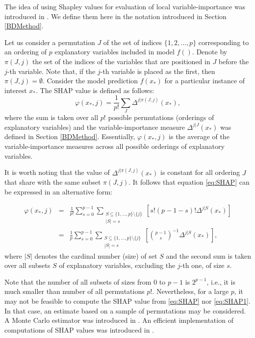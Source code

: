 \documentclass[12pt,]{krantz}
\begin{document}
The idea of using Shapley values for evaluation of local variable-importance was introduced in \citep{imeJLMR}. We define them here in the notation introduced in Section \ref{BDMethod}.

Let us consider a permutation \(J\) of the set of indices \(\{1,2,\ldots,p\}\) corresponding to an ordering of \(p\) explanatory variables included in model \(f()\). Denote by \(\pi(J,j)\) the set of the indices of the variables that are positioned in \(J\) before the \(j\)-th variable. Note that, if the \(j\)-th variable is placed as the first, then \(\pi(J,j) = \emptyset\). Consider the model prediction \(f(x_*)\) for a particular instance of interest \(x_*\). The SHAP value is defined as follows:
\begin{equation}
\varphi(x_*,j) = \frac{1}{p!} \sum_{J} \Delta^{j|\pi(J,j)}(x_*),  
\label{eq:SHAP}
\end{equation}
where the sum is taken over all \(p!\) possible permutations (orderings of explanatory variables) and the variable-importance measure \(\Delta^{j|J}(x_*)\) was defined in Section \ref{BDMethod}. Essentially, \(\varphi(x_*,j)\) is the average of the variable-importance measures across all possible orderings of explanatory variables.

It is worth noting that the value of \(\Delta^{j|\pi(J,j)}(x_*)\) is constant for all ordering \(J\) that share with the same subset \(\pi(J,j)\). It follows that equation \eqref{eq:SHAP} can be expressed in an alternative form:

\begin{eqnarray}
\varphi(x_*,j) &=& \frac 1{p!}\sum_{s=0}^{p-1} \sum_{
\substack{
S \subseteq \{1,\dots,p\}\setminus \{j\} \\ |S|=s
}}  \left[s!(p-1-s)! \Delta^{j|S}(x_*)\right]\nonumber\\
&=&
\frac 1{p}\sum_{s=0}^{p-1} \sum_{
\substack{
S \subseteq \{1,\dots,p\}\setminus \{j\} \\ |S|=s
}}  \left[{{p-1}\choose{s}}^{-1} \Delta^{j|S}(x_*)\right],
\label{eq:SHAP1}
\end{eqnarray}
where \(|S|\) denotes the cardinal number (size) of set \(S\) and the second sum is taken over all subsets \(S\) of explanatory variables, excluding the \(j\)-th one, of size \(s\).

Note that the number of all subsets of sizes from 0 to \(p-1\) is \(2^{p-1}\), i.e., it is much smaller than number of all permutations \(p!\). Nevertheless, for a large \(p\), it may not be feasible to compute the SHAP value from \eqref{eq:SHAP} nor \eqref{eq:SHAP1}. In that case, an estimate based on a sample of permutations may be considered. A Monte Carlo estimator was introduced in \citep{Strumbelj2014}. An efficient implementation of computations of SHAP values was introduced in \citep{SHAP}.
\end{document}

